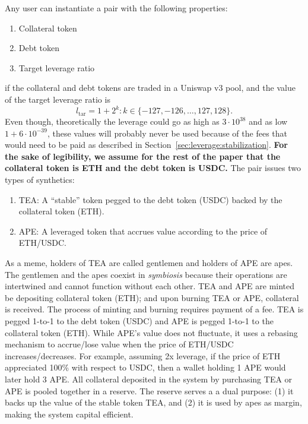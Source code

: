 \documentclass[journal,letterpaper,oneside,onecolumn,12pt]{IEEEtran}
\begin{document}
	Any user can instantiate a pair with the following properties:
	\begin{enumerate}
		\item Collateral token
		\item Debt token
		\item Target leverage ratio
	\end{enumerate}
	if the collateral and debt tokens are traded in a Uniswap v3 pool, and the value of the target leverage ratio is
	\begin{equation}
		l_\textrm{tar} = 1+2^k : k\in\{-127,-126,\ldots,127,128\}.
	\end{equation}
	Even though, theoretically the leverage could go as high as $3\cdot10^{38}$ and as low $1+6\cdot10^{-39}$, these values will probably never be used because of the fees that would need to be paid as described in Section~\ref{sec:leverage:stabilization}.
	\textbf{For the sake of legibility, we assume for the rest of the paper that the collateral token is ETH and the debt token is USDC.}
	The pair issues two types of synthetics:
	\begin{enumerate}
		\item TEA: A ``stable'' token pegged to the debt token (USDC) backed by the collateral token (ETH).
		\item APE: A leveraged token that accrues value according to the price of ETH/USDC.
	\end{enumerate}
	As a meme, holders of TEA are called gentlemen and holders of APE are apes. The gentlemen and the apes coexist in \textit{symbiosis} because their operations are intertwined and cannot function without each other. TEA and APE are minted be depositing collateral token (ETH); and upon burning TEA or APE, collateral is received. The process of minting and burning requires payment of a fee.
	TEA is pegged 1-to-1 to the debt token (USDC) and APE is pegged 1-to-1 to the collateral token (ETH). While APE's value does not fluctuate, it uses a rebasing mechanism to accrue/lose value when the price of ETH/USDC increases/decreases. For example, assuming 2x leverage, if the price of ETH appreciated 100\% with respect to USDC, then a wallet holding 1 APE would later hold 3 APE.
	All collateral deposited in the system by purchasing TEA or APE is pooled together in a 
	reserve. 
	The reserve serves a a dual purpose: (1) it backs up the value of the stable token TEA, and (2) it is used by apes as margin, making the system capital efficient.
\end{document}
